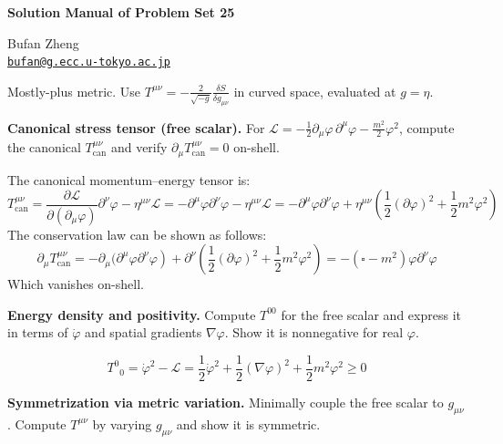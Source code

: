 \resetproblem
\begin{center}
    {\LARGE \textbf{Solution Manual of Problem Set 25} \par}
    \vspace{1em}
    {\large Bufan Zheng\\ \href{mailto:bufan@g.ecc.u-tokyo.ac.jp}{\texttt{bufan@g.ecc.u-tokyo.ac.jp}} \par}
\end{center}

\noindent Mostly-plus metric. Use \(T^{\mu\nu}=-\frac{2}{\sqrt{-g}}\frac{\delta S}{\delta g_{\mu\nu}}\) in curved space, evaluated at \(g=\eta\).

\begin{problem}
    \textbf{Canonical stress tensor (free scalar).} For \(\mathcal{L}=-\frac{1}{2}\partial_\mu\varphi\,\partial^\mu\varphi-\frac{m^2}{2}\varphi^2\), compute the canonical \(T^{\mu\nu}_{\text{can}}\) and verify \(\partial_\mu T^{\mu\nu}_{\text{can}}=0\) on-shell.
\end{problem}
\begin{solution}[25.1]
	The canonical momentum--energy tensor is:
	\[
	T_{\mathrm{can}}^{\mu\nu}=\frac{\partial\mathcal{L}}{\partial(\partial_\mu\varphi)}\partial^\nu\varphi-\eta^{\mu\nu}\mathcal{L}=-\partial^{\mu}\varphi\left.\partial^{\nu}\varphi-\eta^{\mu\nu}\mathcal{L}=-\partial^{\mu}\varphi\right.\partial^{\nu}\varphi+\eta^{\mu\nu}\left(\frac{1}{2}(\partial\varphi)^2+\frac{1}{2}m^2\varphi^2\right)
	\]
	The conservation law can be shown as follows:
	\[
	\partial_\mu T_{\mathrm{can}}^{\mu\nu}=-\partial_\mu(\partial^\mu\varphi\left.\partial^\nu\varphi\right)+\partial^\nu\left(\frac{1}{2}(\partial\varphi)^2+\frac{1}{2}m^2\varphi^2\right)=-(\square-m^2)\varphi\partial^\nu\varphi
	\]
	Which vanishes on-shell.
\end{solution}
\begin{problem}
    \textbf{Energy density and positivity.} Compute \(T^{00}\) for the free scalar and express it in terms of \(\dot{\varphi}\) and spatial gradients \(\nabla\varphi\). Show it is nonnegative for real \(\varphi\).
\end{problem}
\begin{solution}[25.2]
	\[
	{T^0}_0=\dot{\varphi}^2-\mathcal{L}=\frac{1}{2}\dot{\varphi}^2+\frac{1}{2}(\nabla\varphi)^2+\frac{1}{2}m^2\varphi^2\geq0
	\]
\end{solution}
\begin{problem}
    \textbf{Symmetrization via metric variation.} Minimally couple the free scalar to \(g_{\mu\nu}\). Compute \(T^{\mu\nu}\) by varying \(g_{\mu\nu}\) and show it is symmetric.
\end{problem}
